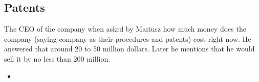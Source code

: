 \documentclass{article}
\begin{document}
\subsection{Patents}
The CEO of the company when asked by Mariusz how much money does the company
(saying company as their procedures and patents) cost right now. He answered
that around 20 to 50 million dollars. Later he mentions that he would sell it by
no less than 200 million.
\begin{itemize}
  \item 
\end{itemize}
\end{document}

